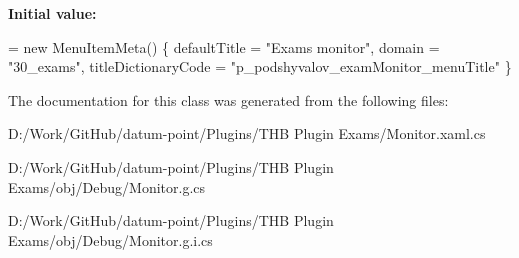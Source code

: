{\bfseries Initial value\+:}
\begin{DoxyCode}
= \textcolor{keyword}{new} MenuItemMeta()
        \{
            defaultTitle = \textcolor{stringliteral}{"Exams monitor"},
            domain = \textcolor{stringliteral}{"30\_exams"},
            titleDictionaryCode = \textcolor{stringliteral}{"p\_podshyvalov\_examMonitor\_menuTitle"}
        \}
\end{DoxyCode}


The documentation for this class was generated from the following files\+:\begin{DoxyCompactItemize}
\item 
D\+:/\+Work/\+Git\+Hub/datum-\/point/\+Plugins/\+T\+H\+B Plugin Exams/Monitor.\+xaml.\+cs\item 
D\+:/\+Work/\+Git\+Hub/datum-\/point/\+Plugins/\+T\+H\+B Plugin Exams/obj/\+Debug/Monitor.\+g.\+cs\item 
D\+:/\+Work/\+Git\+Hub/datum-\/point/\+Plugins/\+T\+H\+B Plugin Exams/obj/\+Debug/Monitor.\+g.\+i.\+cs\end{DoxyCompactItemize}
